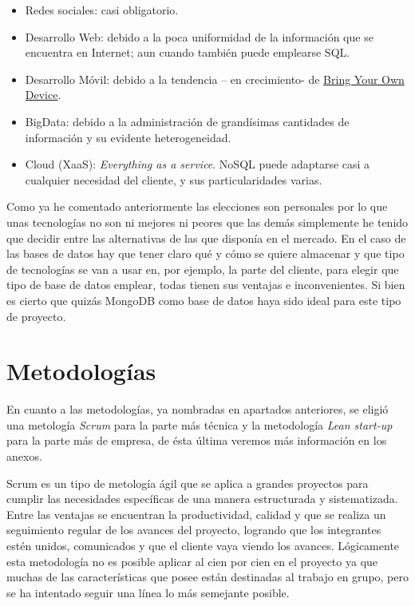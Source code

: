       \begin{itemize}
      \item Redes sociales: casi obligatorio.
	  \item Desarrollo Web: debido a la poca uniformidad de la información que se encuentra en Internet; aun cuando también puede emplearse SQL.
  \item Desarrollo Móvil: debido a la tendencia – en crecimiento- de \hyperlink{ https://es.wikipedia.org/wiki/Bring_your_own_device
}{Bring Your Own Device}.
  \item BigData: debido a la administración de grandísimas cantidades de información y su evidente heterogeneidad.
  \item Cloud (XaaS): \textit{Everything as a service}. NoSQL puede adaptarse casi a cualquier necesidad del cliente, y sus particularidades varias.
    \end{itemize}
   
    Como ya he comentado anteriormente las elecciones son personales por lo que unas tecnologías no son ni mejores ni peores que las demás simplemente he tenido que decidir entre las alternativas de las que disponía en el mercado. En el caso de las bases de datos hay que tener claro qué y cómo se quiere almacenar y que tipo de tecnologías se van a usar en, por ejemplo, la parte del cliente, para elegir que tipo de base de datos emplear, todas tienen sus ventajas e inconvenientes. Si bien es cierto que quizás MongoDB como base de datos haya sido ideal para este tipo de proyecto.

  \section{Metodologías}\label{metodologia}

En cuanto a las metodologías, ya nombradas en apartados anteriores, se eligió una metología \emph{Scrum} para la parte más técnica y la metodología \emph{Lean start-up} para la parte más de empresa, de ésta última veremos más información en los anexos.

Scrum es un tipo de metología ágil que se aplica a grandes proyectos para cumplir las necesidades específicas de una manera estructurada y sistematizada. Entre las ventajas se encuentran la productividad, calidad y que se realiza un seguimiento regular de los avances del proyecto, logrando que los integrantes estén unidos, comunicados y que el cliente vaya viendo los avances. Lógicamente esta metodología no es posible aplicar al cien por cien en el proyecto ya que muchas de las características que posee están destinadas al trabajo en grupo, pero se ha intentado seguir una línea lo más semejante posible. 


